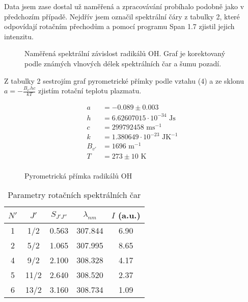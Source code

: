 \documentclass[a4paper,11pt]{article}
\begin{document}
Data jsem zase dostal už naměřená a zpracovávání probíhalo podobně jako v předchozím případě. Nejdřív jsem označil spektrální čáry z tabulky 2, které odpovídají rotačním přechodům a pomocí programu Span 1.7 zjistil jejich intenzitu.

\begin{figure}[htpb]
    \centering
    
    \vspace{40pt}
    \captionsetup{type=graph}
    \caption{Naměřená spektrální závislost radikálů OH. Graf je korektovaný podle známých vlnových délek spektrálních čar a šumu pozadí.}
\end{figure}

\begin{table}[htpb]
    \vspace{-20pt}
    \begin{minipage}[t]{.5\linewidth}
Z tabulky 2 sestrojím graf pyrometrické přímky podle vztahu (4) a ze sklonu $ a = -\frac{B_{v'} hc}{kT} $  zjistím rotační teplotu plazmatu. 


\begin{align*}
    a &= -0.089 \pm 0.003 \\
    h &= 6.62607015 \cdot 10^{-34} \text{ Js} \\
    c &= 299792458 \text{ ms}^{-1} \\
    k &= 1.380649 \cdot 10^{-23}  \text{ JK}^{-1} \\
    B_{v'} &= 1696 \text{ m}^{-1} \\
    T &= 273 \pm 10  \text{ K}\\
\end{align*}

    \end{minipage} 
    \hfill
    \begin{minipage}[t]{.5\linewidth}
        \centering

\begin{figure}[H]
    \vspace{-40pt}
    \centering
    
    \captionsetup{type=graph}
    \caption{Pyrometrická přímka radikálů OH}
\end{figure}


    \end{minipage} 
\end{table}

\begin{table}[htpb]
    \vspace{-30pt}
    \centering
    \begin{tabular}{c c c c c}
        $ N' $  & $ J' $  & $ S_{J'J''} $ & $ \lambda_{nm} $ & $ I $  (a.u.)   \\\hline
        1 & 1/2 & 0.563 & 307.844 & 6.90 \\
        2 & 5/2 & 1.065 & 307.995 & 8.65 \\
        4 & 9/2 & 2.100 & 308.328 & 4.17 \\
        5 & 11/2 & 2.640 & 308.520 & 2.37 \\
        6 & 13/2 & 3.160 & 308.734 & 1.09 \\
    \end{tabular}
    \caption{Parametry rotačních spektrálních čar}
\end{table}
\end{document}
